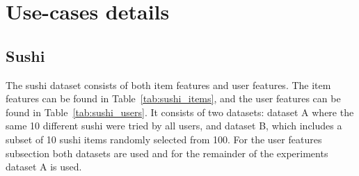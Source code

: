 \documentclass{article}
\begin{document}


\section{Use-cases details}\label{appendix:sushi}
\subsection{Sushi}
The sushi dataset consists of both item features and user features. The item features can be found in Table~\ref{tab:sushi_items}, and the user features can be found in Table~\ref{tab:sushi_users}. It consists of two datasets: dataset A where the same 10 different sushi were tried by all users, and dataset B, which includes a subset of 10 sushi items randomly selected from 100. For the user features subsection both datasets are used and for the remainder of the experiments dataset A is used.
\end{document}
